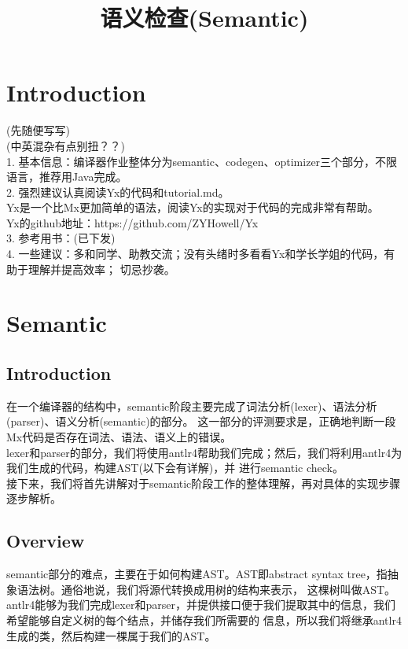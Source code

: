 \documentclass{article}
\title{语义检查(Semantic)}
\begin{document}
\maketitle

\section{Introduction}
\noindent
(先随便写写) \\
(中英混杂有点别扭？？)\\
1. 基本信息：编译器作业整体分为semantic、codegen、optimizer三个部分，不限语言，推荐用Java完成。\\
2. 强烈建议认真阅读Yx的代码和tutorial.md。 \\
Yx是一个比Mx更加简单的语法，阅读Yx的实现对于代码的完成非常有帮助。\\
Yx的github地址：https://github.com/ZYHowell/Yx \\
3. 参考用书：(已下发) \\
4. 一些建议：多和同学、助教交流；没有头绪时多看看Yx和学长学姐的代码，有助于理解并提高效率；
切忌抄袭。\\


\section{Semantic}
\subsection{Introduction}
\noindent
在一个编译器的结构中，semantic阶段主要完成了词法分析(lexer)、语法分析(parser)、语义分析(semantic)的部分。
这一部分的评测要求是，正确地判断一段Mx代码是否存在词法、语法、语义上的错误。\\
lexer和parser的部分，我们将使用antlr4帮助我们完成；然后，我们将利用antlr4为我们生成的代码，构建AST(以下会有详解)，并
进行semantic check。\\
接下来，我们将首先讲解对于semantic阶段工作的整体理解，再对具体的实现步骤逐步解析。

\subsection{Overview}
semantic部分的难点，主要在于如何构建AST。AST即abstract syntax tree，指抽象语法树。通俗地说，我们将源代转换成用树的结构来表示，
这棵树叫做AST。antlr4能够为我们完成lexer和parser，并提供接口便于我们提取其中的信息，我们希望能够自定义树的每个结点，并储存我们所需要的
信息，所以我们将继承antlr4生成的类，然后构建一棵属于我们的AST。\\
\end{document}
